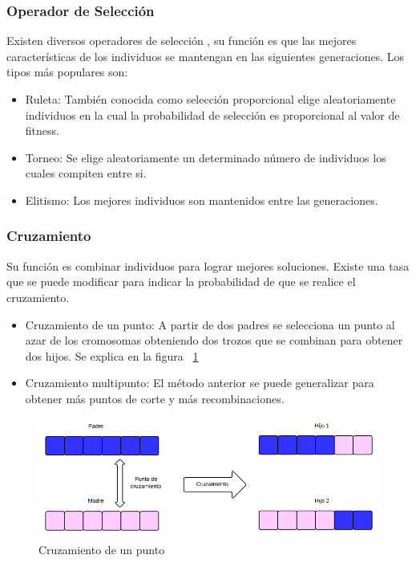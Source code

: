 \subsubsection{Operador de Selección}
Existen diversos operadores de selección , su función es que las mejores características de los individuos se mantengan en las siguientes generaciones.
Los tipos más populares son:

\begin{itemize}
	\item Ruleta: También conocida como selección proporcional elige aleatoriamente individuos en la cual la probabilidad de selección es proporcional al valor de fitness.
	\item Torneo: Se elige aleatoriamente un determinado número de individuos los cuales compiten entre si.
	\item Elitismo: Los mejores individuos son mantenidos entre las generaciones.
\end{itemize}

\subsubsection{Cruzamiento}
Su función es combinar individuos para lograr mejores soluciones. 
Existe una tasa que se puede modificar para indicar la probabilidad de que se realice el cruzamiento.

\begin{itemize}
	\item Cruzamiento de un punto: A partir de dos padres se selecciona un punto al azar de los cromosomas obteniendo dos trozos que se combinan para obtener dos hijos. Se explica en la figura ~\ref{fig:cruzamiento1}
	\item Cruzamiento multipunto: El método anterior se puede generalizar para obtener más puntos de corte y más recombinaciones.
\end{itemize}

\begin{figure}[h]
	\centering
	\includegraphics[width=\textwidth]{Figures/cruzamiento1}
	\caption{Cruzamiento de un punto}
	\label{fig:cruzamiento1}
\end{figure}

